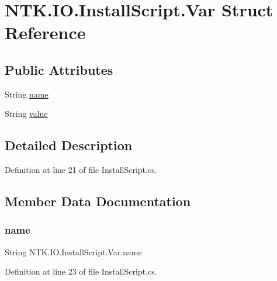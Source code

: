 \hypertarget{struct_n_t_k_1_1_i_o_1_1_install_script_1_1_var}{}\section{N\+T\+K.\+I\+O.\+Install\+Script.\+Var Struct Reference}
\label{struct_n_t_k_1_1_i_o_1_1_install_script_1_1_var}
\subsection*{Public Attributes}
\begin{DoxyCompactItemize}
\item 
String \mbox{\hyperlink{struct_n_t_k_1_1_i_o_1_1_install_script_1_1_var_a753d7d8a77dbb146faff132b71c4d2db}{name}}
\item 
String \mbox{\hyperlink{struct_n_t_k_1_1_i_o_1_1_install_script_1_1_var_acca8498a1070598ef477b2d17876c184}{value}}
\end{DoxyCompactItemize}


\subsection{Detailed Description}


Definition at line 21 of file Install\+Script.\+cs.



\subsection{Member Data Documentation}
\mbox{\label{struct_n_t_k_1_1_i_o_1_1_install_script_1_1_var_a753d7d8a77dbb146faff132b71c4d2db}} 
\subsubsection{\texorpdfstring{name}{name}}
{\footnotesize\ttfamily String N\+T\+K.\+I\+O.\+Install\+Script.\+Var.\+name}



Definition at line 23 of file Install\+Script.\+cs.

\mbox{\label{struct_n_t_k_1_1_i_o_1_1_install_script_1_1_var_acca8498a1070598ef477b2d17876c184}} 
